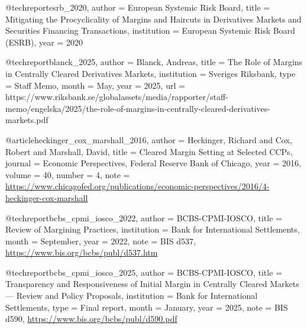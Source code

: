 @techreport{esrb_2020,
  author      = {{European Systemic Risk Board}},
  title       = {Mitigating the Procyclicality of Margins and Haircuts in Derivatives Markets and Securities Financing Transactions},
  institution = {European Systemic Risk Board (ESRB)}, year = {2020}
}


@techreport{blanck_2025,
  author      = {Blanck, Andreas},
  title       = {The Role of Margins in Centrally Cleared Derivatives Markets},
  institution = {Sveriges Riksbank}, type = {Staff Memo}, month = {May}, year = {2025},
  url         = {https://www.riksbank.se/globalassets/media/rapporter/staff-memo/engelska/2025/the-role-of-margins-in-centrally-cleared-derivatives-markets.pdf}
}


@article{heckinger_cox_marshall_2016,
  author  = {Heckinger, Richard and Cox, Robert and Marshall, David},
  title   = {Cleared Margin Setting at Selected {CCP}s},
  journal = {Economic Perspectives, Federal Reserve Bank of Chicago},
  year    = {2016}, volume = {40}, number = {4},
  note    = {\url{https://www.chicagofed.org/publications/economic-perspectives/2016/4-heckinger-cox-marshall}}
}


@techreport{bcbs_cpmi_iosco_2022,
  author      = {{BCBS-CPMI-IOSCO}},
  title       = {Review of Margining Practices},
  institution = {Bank for International Settlements}, month = {September}, year = {2022},
  note        = {BIS d537, \url{https://www.bis.org/bcbs/publ/d537.htm}}
}


@techreport{bcbs_cpmi_iosco_2025,
  author      = {{BCBS-CPMI-IOSCO}},
  title       = {Transparency and Responsiveness of Initial Margin in Centrally Cleared Markets --- Review and Policy Proposals},
  institution = {Bank for International Settlements}, type = {Final report}, month = {January}, year = {2025},
  note        = {BIS d590, \url{https://www.bis.org/bcbs/publ/d590.pdf}}
}

